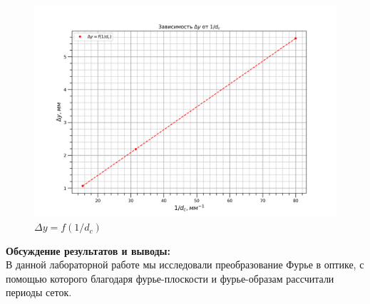 \documentclass[a4paper, 12pt]{article}%
\begin{document}
	
	
	\begin{figure}[H]
		\begin{center}
			\includegraphics[width=0.6\linewidth]{dy.png}
			\caption{$\Delta y = f(1/ d_c)$}
		\end{center}
	\end{figure}
	
	
	
	

	
	
	
	\textbf{Обсуждение результатов и выводы: }\\
	
	
	В данной лабораторной работе мы исследовали преобразование Фурье в оптике, с помощью которого благодаря фурье-плоскости и фурье-образам рассчитали периоды сеток.
	
\end{document}
